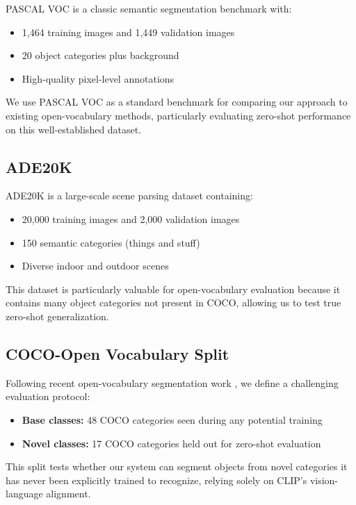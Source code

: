 PASCAL VOC \cite{everingham2010pascal} is a classic semantic segmentation benchmark with:
\begin{itemize}
    \item 1,464 training images and 1,449 validation images
    \item 20 object categories plus background
    \item High-quality pixel-level annotations
\end{itemize}

We use PASCAL VOC as a standard benchmark for comparing our approach to existing open-vocabulary methods, particularly evaluating zero-shot performance on this well-established dataset.

\subsection{ADE20K}

ADE20K is a large-scale scene parsing dataset containing:
\begin{itemize}
    \item 20,000 training images and 2,000 validation images
    \item 150 semantic categories (things and stuff)
    \item Diverse indoor and outdoor scenes
\end{itemize}

This dataset is particularly valuable for open-vocabulary evaluation because it contains many object categories not present in COCO, allowing us to test true zero-shot generalization.

\subsection{COCO-Open Vocabulary Split}

Following recent open-vocabulary segmentation work \cite{ghiasi2022open}, we define a challenging evaluation protocol:
\begin{itemize}
    \item \textbf{Base classes:} 48 COCO categories seen during any potential training
    \item \textbf{Novel classes:} 17 COCO categories held out for zero-shot evaluation
\end{itemize}

This split tests whether our system can segment objects from novel categories it has never been explicitly trained to recognize, relying solely on CLIP's vision-language alignment.

